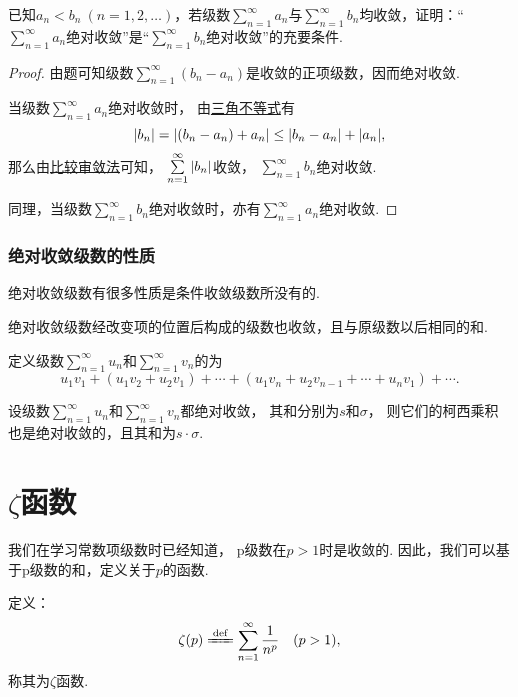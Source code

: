 \begin{example}
已知\(a_n < b_n\ (n=1,2,\dotsc)\)，若级数\(\sum\limits_{n=1}^\infty a_n\)与\(\sum\limits_{n=1}^\infty b_n\)均收敛，证明：“\(\sum\limits_{n=1}^\infty a_n\)绝对收敛”是“\(\sum\limits_{n=1}^\infty b_n\)绝对收敛”的充要条件.
\begin{proof}
由题可知级数\(\sum\limits_{n=1}^\infty (b_n - a_n)\)是收敛的正项级数，因而绝对收敛.

当级数\(\sum\limits_{n=1}^\infty a_n\)绝对收敛时，
由\hyperref[theorem:不等式.三角不等式1]{三角不等式}有\[
	\abs{b_n} = \abs{(b_n - a_n) + a_n}
	\leq \abs{b_n - a_n} + \abs{a_n},
\]
那么由\hyperref[theorem:无穷级数.正项级数的比较审敛法]{比较审敛法}可知，
\(\sum\limits_{n=1}^\infty \abs{b_n}\)收敛，
\(\sum\limits_{n=1}^\infty b_n\)绝对收敛.

同理，当级数\(\sum\limits_{n=1}^\infty b_n\)绝对收敛时，亦有\(\sum\limits_{n=1}^\infty a_n\)绝对收敛.
\end{proof}
\end{example}

\subsubsection{绝对收敛级数的性质}
绝对收敛级数有很多性质是条件收敛级数所没有的.

\begin{property}[绝对收敛级数的可交换性]\label{theorem:无穷级数.绝对收敛级数的可交换性}
绝对收敛级数经改变项的位置后构成的级数也收敛，且与原级数以后相同的和.
\end{property}

\begin{definition}\label{definition:无穷级数.绝对收敛级数的柯西乘积}
定义级数\(\sum\limits_{n=1}^\infty u_n\)和\(\sum\limits_{n=1}^\infty v_n\)的为\[
u_1 v_1 + (u_1 v_2 + u_2 v_1) + \dotsb + (u_1 v_n + u_2 v_{n-1} + \dotsb + u_n v_1) + \dotsb.
\]
\end{definition}

\begin{theorem}\label{theorem:无穷级数.绝对收敛级数的柯西乘积必收敛}
设级数\(\sum\limits_{n=1}^\infty u_n\)和\(\sum\limits_{n=1}^\infty v_n\)都绝对收敛，
其和分别为\(s\)和\(\sigma\)，
则它们的柯西乘积也是绝对收敛的，且其和为\(s \cdot \sigma\).
\end{theorem}

\section{\texorpdfstring{\(\zeta\)}{\textzeta}函数}
我们在学习常数项级数时已经知道，
p级数在\(p>1\)时是收敛的.
因此，我们可以基于p级数的和，定义关于\(p\)的函数.
\begin{definition}
定义：\[
	\zeta(p)
	\defeq
	\sum\limits_{n=1}^\infty \frac{1}{n^p}
	\quad(p>1),
\]
称其为\(\zeta\)函数.
\end{definition}

